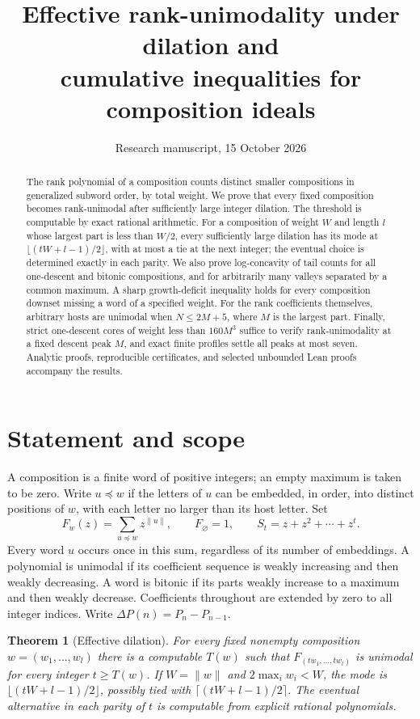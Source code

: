 \documentclass[11pt]{article}
\title{Effective rank-unimodality under dilation and\\cumulative inequalities for composition ideals}
\author{}
\date{Research manuscript, 15 October 2026}
\newtheorem{theorem}{Theorem}[section]
\theoremstyle{remark}\newtheorem{remark}[theorem]{Remark}
\newcommand{\wt}[1]{\lVert #1\rVert}
\newcommand{\Del}{\Delta}
\begin{document}
\maketitle
\begin{abstract}
The rank polynomial of a composition counts distinct smaller compositions in generalized subword order, by total weight. We prove that every fixed composition becomes rank-unimodal after sufficiently large integer dilation. The threshold is computable by exact rational arithmetic. For a composition of weight $W$ and length $l$ whose largest part is less than $W/2$, every sufficiently large dilation has its mode at $\lfloor(tW+l-1)/2\rfloor$, with at most a tie at the next integer; the eventual choice is determined exactly in each parity. We also prove log-concavity of tail counts for all one-descent and bitonic compositions, and for arbitrarily many valleys separated by a common maximum. A sharp growth-deficit inequality holds for every composition downset missing a word of a specified weight. For the rank coefficients themselves, arbitrary hosts are unimodal when $N\le2M+5$, where $M$ is the largest part. Finally, strict one-descent cores of weight less than $160M^3$ suffice to verify rank-unimodality at a fixed descent peak $M$, and exact finite profiles settle all peaks at most seven. Analytic proofs, reproducible certificates, and selected unbounded Lean proofs accompany the results.
\end{abstract}

\section{Statement and scope}
A composition is a finite word of positive integers; an empty maximum is taken to be zero. Write $u\preceq w$ if the letters of $u$ can be embedded, in order, into distinct positions of $w$, with each letter no larger than its host letter. Set
\[
 F_w(z)=\sum_{u\preceq w}z^{\wt u},\qquad F_\varnothing=1,
 \qquad S_t=z+z^2+\cdots+z^t.
\]
Every word $u$ occurs once in this sum, regardless of its number of embeddings. A polynomial is unimodal if its coefficient sequence is weakly increasing and then weakly decreasing. A word is bitonic if its parts weakly increase to a maximum and then weakly decrease. Coefficients throughout are extended by zero to all integer indices. Write $\Del P(n)=P_n-P_{n-1}$.

\begin{theorem}[Effective dilation]\label{thm:dilationmain}
For every fixed nonempty composition $w=(w_1,\ldots,w_l)$ there is a
computable $T(w)$ such that $F_{(tw_1,\ldots,tw_l)}$ is unimodal for
every integer $t\ge T(w)$.
If $W=\wt w$ and $2\max_iw_i<W$, the mode is
$\lfloor(tW+l-1)/2\rfloor$, possibly tied with
$\lceil(tW+l-1)/2\rceil$. The eventual alternative in each parity of
$t$ is computable from explicit rational polynomials.
\end{theorem}
\end{document}
